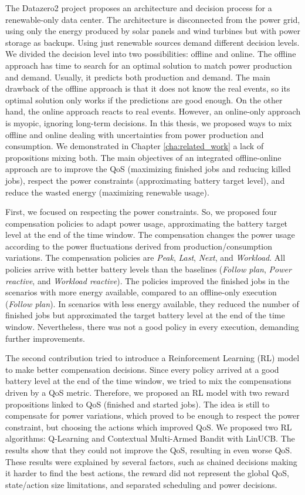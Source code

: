The Datazero2 project proposes an architecture and decision process for a renewable-only data center. The architecture is disconnected from the power grid, using only the energy produced by solar panels and wind turbines but with power storage as backups. Using just renewable sources demand different decision levels. We divided the decision level into two possibilities: offline and online. The offline approach has time to search for an optimal solution to match power production and demand. Usually, it predicts both production and demand. The main drawback of the offline approach is that it does not know the real events, so its optimal solution only works if the predictions are good enough. On the other hand, the online approach reacts to real events. However, an online-only approach is myopic, ignoring long-term decisions. In this thesis, we proposed ways to mix offline and online dealing with uncertainties from power production and consumption. We demonstrated in Chapter \ref{cha:related_work} a lack of propositions mixing both. The main objectives of an integrated offline-online approach are to improve the QoS (maximizing finished jobs and reducing killed jobs), respect the power constraints (approximating battery target level), and reduce the wasted energy (maximizing renewable usage).

First, we focused on respecting the power constraints. So, we proposed four compensation policies to adapt power usage, approximating the battery target level at the end of the time window. The compensation changes the power usage according to the power fluctuations derived from production/consumption variations. The compensation policies are \emph{Peak}, \emph{Last}, \emph{Next}, and \emph{Workload}. All policies arrive with better battery levels than the baselines (\emph{Follow plan}, \emph{Power reactive}, and \emph{Workload reactive}). The policies improved the finished jobs in the scenarios with more energy available, compared to an offline-only execution (\emph{Follow plan}). In scenarios with less energy available, they reduced the number of finished jobs but approximated the target battery level at the end of the time window. Nevertheless, there was not a good policy in every execution, demanding further improvements.

The second contribution tried to introduce a Reinforcement Learning (RL) model to make better compensation decisions. Since every policy arrived at a good battery level at the end of the time window, we tried to mix the compensations driven by a QoS metric. Therefore, we proposed an RL model with two reward propositions linked to QoS (finished and started jobs). The idea is still to compensate for power variations, which proved to be enough to respect the power constraint, but choosing the actions which improved QoS. We proposed two RL algorithms: Q-Learning and Contextual Multi-Armed Bandit with LinUCB. The results show that they could not improve the QoS, resulting in even worse QoS. These results were explained by several factors, such as chained decisions making it harder to find the best actions, the reward did not represent the global QoS, state/action size limitations, and separated scheduling and power decisions.

